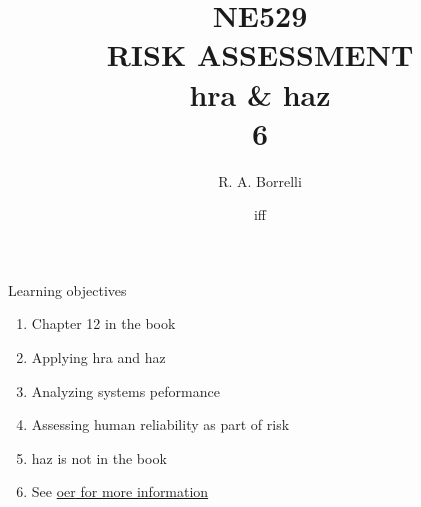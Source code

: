 \documentclass[aspectratio=1610,pdftex,dvipsnames,compress,xcolor={dvipsnames}]{beamer}
\title[NE529 -- Risk Assessment]{NE529\\RISK ASSESSMENT\\\acs{hra} \& \acs{haz}\\6}
\author[@TheDoctorRAB]{R. A. Borrelli}
\institute[]{
    \acl{ui}\\
    \vspace{0.10in}
    }
\date{\acl{iff}}
\newcommand{\acs}{\acrshort} %
\begin{document}
\nobibliography* %


{
    \begin{frame}[plain]{}
        \titlepage
    \end{frame}
}


\begin{frame}{Learning objectives}
    \begin{enumerate}[series=outerlist,topsep=0pt,itemsep=21pt,leftmargin=*,label=(\arabic*)]
        \item[]Chapter 12 in the book
        \item[]Applying \acs{hra} and \acs{haz}
        \item[]Analyzing systems peformance 
        \item[]Assessing human reliability as part of risk
        \item[]\acs{haz} is not in the book
        \item[]See \href{https://uidaho.pressbooks.pub/riskassessment/}{\acs{oer} for more information}
    \end{enumerate}
\end{frame}
\end{document}
